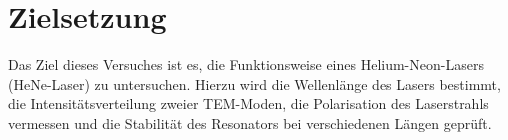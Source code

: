 \section{Zielsetzung}
\label{sec:Zielsetzung}
Das Ziel dieses Versuches ist es, die Funktionsweise eines Helium-Neon-Lasers (HeNe-Laser) zu untersuchen. Hierzu wird die Wellenlänge des Lasers bestimmt, die Intensitätsverteilung zweier TEM-Moden, die Polarisation des Laserstrahls vermessen und 
die Stabilität des Resonators bei verschiedenen Längen geprüft.